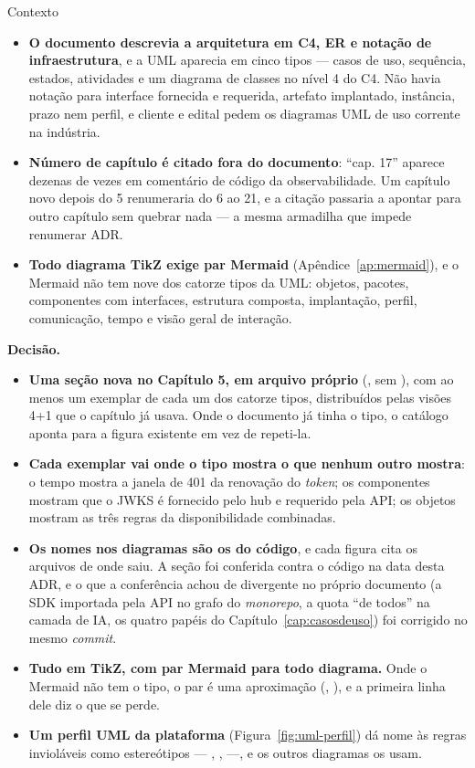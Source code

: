 \begin{especificacao}{Contexto}
\begin{itemize}
  \item \textbf{O documento descrevia a arquitetura em C4, ER e notação de
    infraestrutura}, e a UML aparecia em cinco tipos --- casos de uso,
    sequência, estados, atividades e um diagrama de classes no nível 4 do C4. Não
    havia notação para interface fornecida e requerida, artefato implantado,
    instância, prazo nem perfil, e cliente e edital pedem os diagramas UML de
    uso corrente na indústria.
  \item \textbf{Número de capítulo é citado fora do documento}: \enquote{cap. 17}
    aparece dezenas de vezes em comentário de código da observabilidade. Um
    capítulo novo depois do 5 renumeraria do 6 ao 21, e a citação passaria a
    apontar para outro capítulo sem quebrar nada --- a mesma armadilha que
    impede renumerar ADR.
  \item \textbf{Todo diagrama TikZ exige par Mermaid} (Apêndice~\ref{ap:mermaid}),
    e o Mermaid não tem nove dos catorze tipos da UML: objetos, pacotes,
    componentes com interfaces, estrutura composta, implantação, perfil,
    comunicação, tempo e visão geral de interação.
\end{itemize}
\end{especificacao}

\textbf{Decisão.}

\begin{itemize}
  \item \textbf{Uma seção nova no Capítulo 5, em arquivo próprio}
    (, sem ), com
    ao menos um exemplar de cada um dos catorze tipos, distribuídos pelas visões
    4+1 que o capítulo já usava. Onde o documento já tinha o tipo, o catálogo
    aponta para a figura existente em vez de repeti-la.
  \item \textbf{Cada exemplar vai onde o tipo mostra o que nenhum outro mostra}:
    o tempo mostra a janela de 401 da renovação do \emph{token}; os componentes
    mostram que o JWKS é fornecido pelo hub e requerido pela API; os objetos
    mostram as três regras da disponibilidade combinadas.
  \item \textbf{Os nomes nos diagramas são os do código}, e cada figura cita os
    arquivos de onde saiu. A seção foi conferida contra o código na data desta
    ADR, e o que a conferência achou de divergente no próprio documento (a SDK
    importada pela API no grafo do \emph{monorepo}, a quota \enquote{de todos}
    na camada de IA, os quatro papéis do Capítulo~\ref{cap:casosdeuso}) foi
    corrigido no mesmo \emph{commit}.
  \item \textbf{Tudo em TikZ, com par Mermaid para todo diagrama.} Onde o Mermaid
    não tem o tipo, o par é uma aproximação (, ), e a
    primeira linha dele diz o que se perde.
  \item \textbf{Um perfil UML da plataforma} (Figura~\ref{fig:uml-perfil}) dá nome
    às regras invioláveis como estereótipos --- ,
    ,  ---, e os outros diagramas
    os usam.
\end{itemize}

